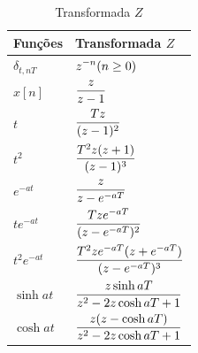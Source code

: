 \documentclass{yagoexam}
\begin{document}
\begin{table}[!ht]
	\caption{Transformada $Z$}\label{ztable}
	\vspace{0.5cm}
\setlength{\arrayrulewidth}{0.5mm}
\setlength{\tabcolsep}{20pt}
\renewcommand{\arraystretch}{1.5}

\begin{tabular}{ |p{7cm}|p{7cm}|  }
\hline
\textbf{Funções} & \textbf{Transformada $Z$} \\
\hline
$\delta _{t,nT}$  & $\displaystyle z^{-n}(n\geq 0)\vspace{0.16in}$  \\
$x[n]$  & $\displaystyle\frac{z}{z-1}\vspace{0.16in}$    \\
$t$  & $\displaystyle \frac{Tz}{(z-1)^2}\vspace{0.16in}$    \\
$t^2$  & $\displaystyle \frac{T^2z(z+1)}{(z-1)^3}\vspace{0.16in}$    \\
$e^{-at}$ & $\displaystyle\frac{z}{z-e^{-aT}}\vspace{0.16in}$    \\
$te^{-at}$    & $\displaystyle\frac{Tze^{-aT}}{(z-e^{-aT})^{2}}\vspace{0.16in}$  \\
$t^{2}e^{-at}$ & $\displaystyle\frac{T^{2}ze^{-aT}(z+e^{-aT})}{%
(z-e^{-aT})^{3}}\vspace{0.16in}$  \\
$\sinh at$ & $\displaystyle\frac{z\sinh aT}{z^{2}-2z\cosh aT+1}\vspace{0.16in%
}$    \\
$\cosh at$ & $\displaystyle\frac{z(z-\cosh aT)}{z^{2}-2z\cosh aT+1}\vspace{%
0.16in}$  \\
\hline
\end{tabular}
\end{table}
    
	


\end{document}
